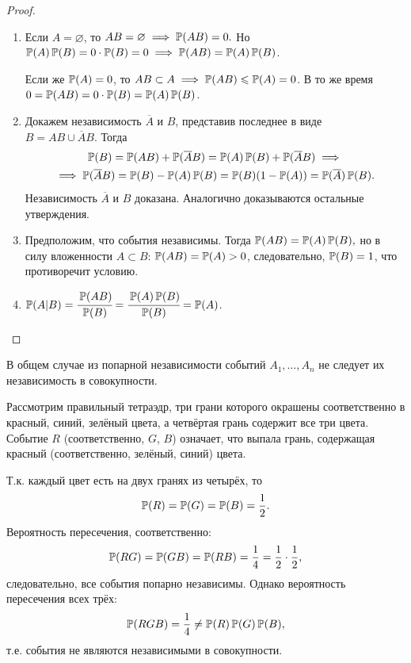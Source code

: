 \begin{proof}
	\begin{enumerate} 
		\item 
		      Если $A = \varnothing$, то $AB = \varnothing \implies \operatorname{\mathbb{P}}(AB) = 0.$ Но $ \operatorname{\mathbb{P}}(A)\operatorname{\mathbb{P}}(B) = 0 \cdot \operatorname{\mathbb{P}}(B) = 0 \implies \operatorname{\mathbb{P}}(AB) = \operatorname{\mathbb{P}}(A) \operatorname{\mathbb{P}}(B)$.
		              
		      Если же ${\operatorname{\mathbb{P}}(A) = 0}$, то ${AB \subset A \implies \operatorname{\mathbb{P}}(AB) \leqslant \operatorname{\mathbb{P}}(A) = 0}$. 
		      В то же время ${0 = \operatorname{\mathbb{P}}(AB) = 0 \cdot \operatorname{\mathbb{P}}(B) = \operatorname{\mathbb{P}}(A) \operatorname{\mathbb{P}}(B)}$.
		\item 
		      Докажем независимость $\overline{A}$ и $B$, представив последнее в виде \\
		      $B = AB \cup \overline{A}B$. Тогда
		      \begin{multline*}
		      	\operatorname{\mathbb{P}}(B) = \operatorname{\mathbb{P}}(AB) + \operatorname{\mathbb{P}}(\overline{A}B) = \operatorname{\mathbb{P}}(A)\operatorname{\mathbb{P}}(B) + \operatorname{\mathbb{P}}(\overline{A}B) \implies \\
                  \implies \operatorname{\mathbb{P}}(\overline{A}B) = \operatorname{\mathbb{P}}(B) - \operatorname{\mathbb{P}}(A)\operatorname{\mathbb{P}}(B) = \operatorname{\mathbb{P}}(B) (1 - \operatorname{\mathbb{P}}(A)) = \operatorname{\mathbb{P}}(\overline{A})\operatorname{\mathbb{P}}(B).
		      \end{multline*}
		      Независимость $\overline{A}$ и $B$ доказана. 
		      Аналогично доказываются остальные утверждения.
		\item
		      Предположим, что события независимы.
		      Тогда $\operatorname{\mathbb{P}}(AB) = \operatorname{\mathbb{P}}(A)\operatorname{\mathbb{P}}(B),$ но в силу вложенности $A \subset B$: $\operatorname{\mathbb{P}}(AB) = \operatorname{\mathbb{P}}(A) > 0$, следовательно, $\operatorname{\mathbb{P}}(B) = 1$, что противоречит условию.
		\item
		      $\operatorname{\mathbb{P}}(A | B) = \cfrac{\operatorname{\mathbb{P}}(AB)}{\operatorname{\mathbb{P}}(B)} = \cfrac{\operatorname{\mathbb{P}}(A)\operatorname{\mathbb{P}}(B)}{\operatorname{\mathbb{P}}(B)} = \operatorname{\mathbb{P}}(A)$.
		      \qedhere
	\end{enumerate}
\end{proof}

\begin{rmrk}
	В общем случае из попарной независимости событий $A_1, \ldots, A_n$ не следует их независимость в совокупности.
	\begin{exmp}
		Рассмотрим правильный тетраэдр, три грани которого окрашены соответственно в красный, синий, зелёный цвета, а четвёртая грань содержит все три цвета. 
		Событие $R$ (соответственно, $G$, $B$) означает, что выпала грань, содержащая красный (соответственно, зелёный, синий) цвета.
		
		Т.к. каждый цвет есть на двух гранях из четырёх, то
		\begin{equation*}
            \operatorname{\mathbb{P}}(R) = \operatorname{\mathbb{P}}(G) = \operatorname{\mathbb{P}}(B) = \frac{1}{2}.
		\end{equation*}
		Вероятность пересечения, соответственно:
		\begin{equation*}
            \operatorname{\mathbb{P}}(RG) = \operatorname{\mathbb{P}}(GB) = \operatorname{\mathbb{P}}(RB) = \frac{1}{4} = \frac{1}{2} \cdot \frac{1}{2},
		\end{equation*}
		следовательно, все события попарно независимы. 
		Однако вероятность пересечения всех трёх:
		\begin{equation*}
            \operatorname{\mathbb{P}}(RGB)  = \frac{1}{4} \neq \operatorname{\mathbb{P}}(R) \operatorname{\mathbb{P}}(G) \operatorname{\mathbb{P}}(B),
		\end{equation*}
		т.е. события не являются независимыми в совокупности. 
	\end{exmp}
\end{rmrk}

